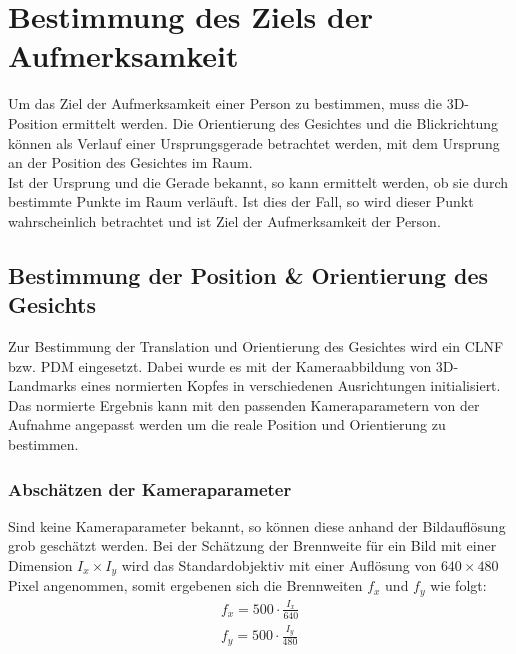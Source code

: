 \section{Bestimmung des Ziels der Aufmerksamkeit}
\label{calc_Position}
Um das Ziel der Aufmerksamkeit einer Person zu bestimmen, muss die 3D-Position ermittelt werden. Die Orientierung des Gesichtes und die Blickrichtung können als Verlauf einer Ursprungsgerade betrachtet werden, mit dem Ursprung an der Position des Gesichtes im Raum.\\
Ist der Ursprung und die Gerade bekannt, so kann ermittelt werden, ob sie durch bestimmte Punkte im Raum verläuft. Ist dies der Fall, so wird dieser Punkt wahrscheinlich betrachtet und ist Ziel der Aufmerksamkeit der Person.
\subsection{Bestimmung der Position \& Orientierung des Gesichts}
Zur Bestimmung der Translation und Orientierung des Gesichtes wird ein CLNF bzw. PDM eingesetzt. Dabei wurde es mit der Kameraabbildung von 3D-Landmarks eines normierten Kopfes in verschiedenen Ausrichtungen initialisiert. Das normierte Ergebnis kann mit den passenden Kameraparametern von der Aufnahme angepasst werden um die reale Position und Orientierung zu bestimmen.
\subsubsection{Abschätzen der Kameraparameter}
Sind keine Kameraparameter bekannt, so können diese anhand der Bildauflösung grob geschätzt werden. Bei der Schätzung der Brennweite für ein Bild mit einer Dimension $I_x\times I_y$ wird das Standardobjektiv mit einer Auflösung von $640 \times 480$ Pixel angenommen, somit ergebenen sich die Brennweiten $f_x$ und $f_y$ wie folgt:
\begin{align*}
f_x = 500\cdot \frac{I_x}{640}\\
f_y = 500\cdot \frac{I_y}{480}
\end{align*}

